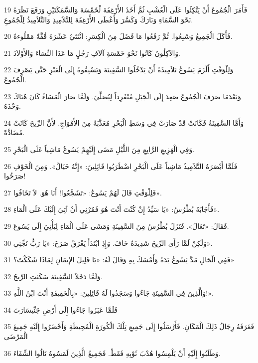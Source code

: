 \par 19 فَأَمَرَ الْجُمُوعَ أَنْ يَتَّكِئُوا عَلَى الْعُشْبِ ثُمَّ أَخَذَ الأَرْغِفَةَ لْخَمْسَةَ وَالسَّمَكَتَيْنِ وَرَفَعَ نَظَرَهُ نَحْوَ السَّمَاءِ وَبَارَكَ وَكَسَّرَ وَأَعْطَى الأَرْغِفَةَ لِلتَّلاَمِيذِ وَالتَّلاَمِيذُ لِلْجُمُوعِ.
\par 20 فَأَكَلَ الْجَمِيعُ وَشَبِعُوا. ثُمَّ رَفَعُوا مَا فَضَلَ مِنَ الْكِسَرِ: اثْنَتَيْ عَشْرَةَ قُفَّةً مَمْلُوءةً.
\par 21 وَالآكِلُونَ كَانُوا نَحْوَ خَمْسَةِ آلاَفِ رَجُلٍ مَا عَدَا النِّسَاءَ وَالأَوْلاَدَ.
\par 22 وَلِلْوَقْتِ أَلْزَمَ يَسُوعُ تَلاَمِيذَهُ أَنْ يَدْخُلُوا السَّفِينَةَ وَيَسْبِقُوهُ إِلَى الْعَبْرِ حَتَّى يَصْرِفَ الْجُمُوعَ.
\par 23 وَبَعْدَمَا صَرَفَ الْجُمُوعَ صَعِدَ إِلَى الْجَبَلِ مُنْفَرِداً لِيُصَلِّيَ. وَلَمَّا صَارَ الْمَسَاءُ كَانَ هُنَاكَ وَحْدَهُ.
\par 24 وَأَمَّا السَّفِينَةُ فَكَانَتْ قَدْ صَارَتْ فِي وَسَطِ الْبَحْرِ مُعَذَّبَةً مِنَ الأَمْوَاجِ. لأَنَّ الرِّيحَ كَانَتْ مُضَادَّةً.
\par 25 وَفِي الْهَزِيعِ الرَّابِعِ مِنَ اللَّيْلِ مَضَى إِلَيْهِمْ يَسُوعُ مَاشِياً عَلَى الْبَحْرِ.
\par 26 فَلَمَّا أَبْصَرَهُ التَّلاَمِيذُ مَاشِياً عَلَى الْبَحْرِ اضْطَرَبُوا قَائِلِينَ: «إِنَّهُ خَيَالٌ». وَمِنَ الْخَوْفِ صَرَخُوا!
\par 27 فَلِلْوَقْتِ قَالَ لَهُمْ يَسُوعُ: «تَشَجَّعُوا! أَنَا هُوَ. لاَ تَخَافُوا».
\par 28 فَأَجَابَهُ بُطْرُسُ: «يَا سَيِّدُ إِنْ كُنْتَ أَنْتَ هُوَ فَمُرْنِي أَنْ آتِيَ إِلَيْكَ عَلَى الْمَاءِ».
\par 29 فَقَالَ: «تَعَالَ». فَنَزَلَ بُطْرُسُ مِنَ السَّفِينَةِ وَمَشَى عَلَى الْمَاءِ لِيَأْتِيَ إِلَى يَسُوعَ.
\par 30 وَلَكِنْ لَمَّا رَأَى الرِّيحَ شَدِيدَةً خَافَ. وَإِذِ ابْتَدَأَ يَغْرَقُ صَرَخَ: «يَا رَبُّ نَجِّنِي».
\par 31 فَفِي الْحَالِ مَدَّ يَسُوعُ يَدَهُ وَأَمْسَكَ بِهِ وَقَالَ لَهُ: «يَا قَلِيلَ الإِيمَانِ لِمَاذَا شَكَكْتَ؟»
\par 32 وَلَمَّا دَخَلاَ السَّفِينَةَ سَكَنَتِ الرِّيحُ.
\par 33 وَالَّذِينَ فِي السَّفِينَةِ جَاءُوا وَسَجَدُوا لَهُ قَائِلِينَ: «بِالْحَقِيقَةِ أَنْتَ ابْنُ اللَّهِ!».
\par 34 فَلَمَّا عَبَرُوا جَاءُوا إِلَى أَرْضِ جَنِّيسَارَتَ
\par 35 فَعَرَفَهُ رِجَالُ ذَلِكَ الْمَكَانِ. فَأَرْسَلُوا إِلَى جَمِيعِ تِلْكَ الْكُورَةِ الْمُحِيطَةِ وَأَحْضَرُوا إِلَيْهِ جَمِيعَ الْمَرْضَى
\par 36 وَطَلَبُوا إِلَيْهِ أَنْ يَلْمِسُوا هُدْبَ ثَوْبِهِ فَقَطْ. فَجَمِيعُ الَّذِينَ لَمَسُوهُ نَالُوا الشِّفَاءَ.

